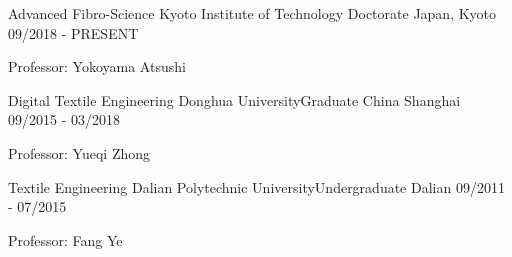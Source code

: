 
\begin{cventries}

  \cventry
  {Advanced Fibro-Science } %
    {Kyoto Institute of Technology \quad Doctorate} %
    {Japan, Kyoto} %
    {09/2018 - PRESENT} %
    {
      \begin{cvitems} %
        \item {Professor: Yokoyama Atsushi}
      \end{cvitems}
    }

  \cventry
    {Digital Textile Engineering} %
    {Donghua University\quad Graduate} %
    {China Shanghai} %
    {09/2015 - 03/2018} %
    {
      \begin{cvitems} %
        \item {Professor: Yueqi Zhong}
      \end{cvitems}
    }

  \cventry
    {Textile Engineering} %
    {Dalian Polytechnic University\quad Undergraduate} %
    {Dalian} %
    {09/2011 - 07/2015} %
    {
      \begin{cvitems} %
        \item {Professor: Fang Ye}
      \end{cvitems}
    }

\end{cventries}
